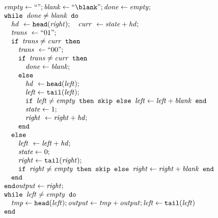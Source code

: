 \begin{exercice}
\begin{corrections}
    $$\begin{array}{l}
      \mathit{empty} \leftarrow ``" ; \mathit{blank} \leftarrow ``\blank" ; \mathit{done} \leftarrow \mathit{empty};\\
      \texttt{while }\mathit{done} \neq \mathit{blank} \texttt{ do }\\
      \quad \mathit{hd}~\leftarrow \texttt{head}(\mathit{right}) ;
      \quad \mathit{curr}~\leftarrow \mathit{state} + \mathit{hd} ;\\
      \quad \mathit{trans}~\leftarrow ``01" ;\\
      \quad \texttt{if }\mathit{trans} \neq \mathit{curr} \texttt{ then }\\
      \quad \quad \mathit{trans}~\leftarrow ``00" ;\\
      \quad \quad \texttt{if }\mathit{trans} \neq \mathit{curr} \texttt{ then }\\
      \quad \quad \quad \mathit{done} \leftarrow \mathit{blank}; \\
      \quad \quad \texttt{else} \\
      \quad \quad \quad \mathit{hd}~\leftarrow \texttt{head}(\mathit{left}) ; \\
      \quad \quad \quad \mathit{left} \leftarrow \texttt{tail}(\mathit{left}) ;\\
      \quad \quad \quad \texttt{if }\mathit{left} \neq \mathit{empty} \texttt{ then skip else } \mathit{left} \leftarrow \mathit{left} + \mathit{blank} \texttt{ end}\\
      \quad \quad \quad \mathit{state} \leftarrow 1 ;\\
      \quad \quad \quad \mathit{right}~ \leftarrow \mathit{right} + \mathit{hd} ;\\
      \quad \quad \texttt{end} \\
      \quad \texttt{else} \\
      \quad \quad \mathit{left}~ \leftarrow \mathit{left} + \mathit{hd} ;\\
      \quad \quad \mathit{state} \leftarrow 0 ;\\
      \quad \quad \mathit{right} \leftarrow \texttt{tail}(\mathit{right}) ;\\
      \quad \quad \texttt{if }\mathit{right} \neq \mathit{empty} \texttt{ then skip else } \mathit{right} \leftarrow \mathit{right} + \mathit{blank} \texttt{ end}\\
      \quad \texttt{end}\\
      \texttt{end}
      \mathit{output} \leftarrow \mathit{right} ;\\
      \texttt{while } \mathit{left} \neq \mathit{empty} \texttt{ do }\\
      \quad \mathit{tmp} \leftarrow \texttt{head}(\mathit{left}) ; \mathit{output} \leftarrow \mathit{tmp} + \mathit{output} ; \mathit{left} \leftarrow \texttt{tail}(\mathit{left})\\
      \texttt{end}
    \end{array}$$
  \end{corrections}
  

\end{exercice}
